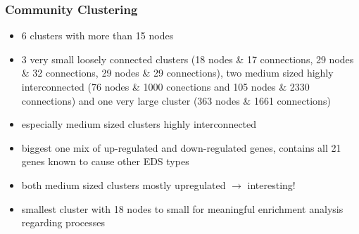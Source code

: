 \subsubsection{Community Clustering}

\begin{itemize}
	\item 6 clusters with more than 15 nodes
	\item 3 very small loosely connected clusters (18 nodes \& 17 connections, 29 nodes \& 32 connections, 29 nodes \& 29 connections), two medium sized highly interconnected (76 nodes \& 1000 conections and 105 nodes \& 2330 connections) and one very large cluster (363 nodes \& 1661 connections)
	\item especially medium sized clusters highly interconnected
	\item biggest one mix of up-regulated and down-regulated genes, contains all 21 genes known to cause other EDS types
	\item both medium sized clusters mostly upregulated $\rightarrow$ interesting!
	\item smallest cluster with 18 nodes to small for meaningful enrichment analysis regarding processes
\end{itemize}